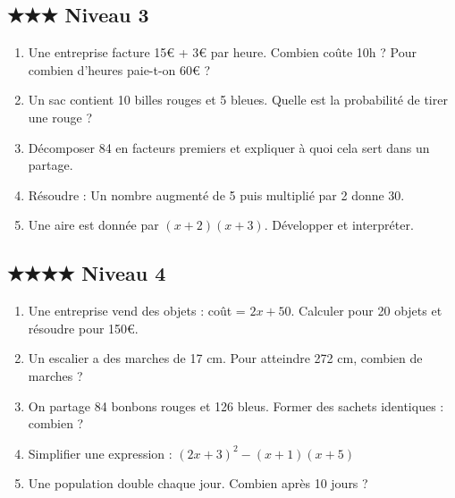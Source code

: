 \documentclass[11pt,a4paper]{article}
\begin{document}
\subsection*{★★★ Niveau 3}

\begin{enumerate}[resume]

\item Une entreprise facture 15€ + 3€ par heure.  
Combien coûte 10h ?  
Pour combien d’heures paie-t-on 60€ ?

\item Un sac contient 10 billes rouges et 5 bleues.  
Quelle est la probabilité de tirer une rouge ?

\item Décomposer 84 en facteurs premiers et expliquer à quoi cela sert dans un partage.

\item Résoudre :  
Un nombre augmenté de 5 puis multiplié par 2 donne 30.

\item Une aire est donnée par $(x+2)(x+3)$.  
Développer et interpréter.

\end{enumerate}

\subsection*{★★★★ Niveau 4}

\begin{enumerate}[resume]

\item Une entreprise vend des objets : coût = $2x + 50$.  
Calculer pour 20 objets et résoudre pour 150€.

\item Un escalier a des marches de 17 cm.  
Pour atteindre 272 cm, combien de marches ?

\item On partage 84 bonbons rouges et 126 bleus.  
Former des sachets identiques : combien ?

\item Simplifier une expression :  
$(2x+3)^2 - (x+1)(x+5)$

\item Une population double chaque jour.  
Combien après 10 jours ?

\end{enumerate}
\end{document}
